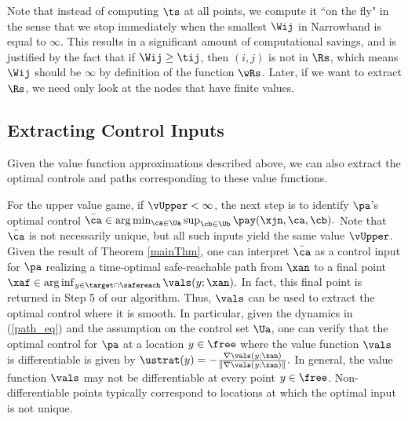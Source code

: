 Note that instead of computing $\ts$ at all points, we compute it ``on the fly" in the sense that we stop immediately when the smallest $\Wij$ in Narrowband is equal to $\infty$. 
This results in a significant amount of computational savings, and is justified by the fact that if $\Wij \ge \tij$, then $(i,j)$ is not in $\Rs$, which means $\Wij$ should be $\infty$ by definition of the function $\wRs$.
Later, if we want to extract $\Rs$, we need only look at the nodes that have finite values. 

 
\subsection{Extracting Control Inputs}


Given the value function approximations described above, we can also extract the optimal controls and paths corresponding to these value functions. 

For the upper value game, if $\vUpper < \infty$, the next step is to identify $\pa$'s optimal control $\bar\ca \in \arg\min_{\ca\in\Ua}\sup_{\cb\in\Ub}  \pay(\xjn,\ca,\cb).$
Note that $\bar\ca$ is not necessarily unique, but all such inputs yield the same value $\vUpper$.  
%
Given the result of Theorem \ref{mainThm}, one can interpret $\bar\ca$ as a control input for $\pa$ realizing a time-optimal safe-reachable path from $\xan$ to a final point $\xaf \in \arg \inf_{y\in\target \cap \safereach} \vals(y;\xan).$
In fact, this final point is returned in Step 5 of our algorithm.
Thus, $\vals$ can be used to extract the optimal 
control where it is smooth.
In particular, given the dynamics in (\ref{path_eq}) and the assumption on the control set $\Ua$, one can verify that the optimal control for $\pa$ at a location $y \in \free$ where the value function $\vals $ is differentiable is given by $\ustrat(y) = -\frac{\nabla \vals(y;\xan)}{\|\nabla \vals(y;\xan)\|}.$
In general, the value function $\vals$ may not be differentiable at every point $y\in\free$.  Non-differentiable points typically correspond to locations at which the optimal input is not unique.

